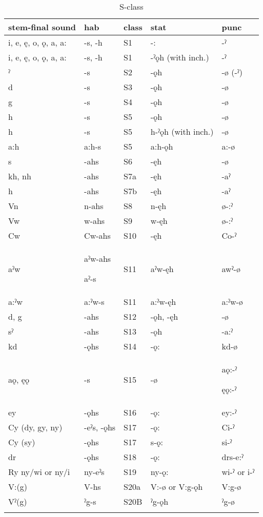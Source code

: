 \begin{table}
\caption{S-class}
\label{tab:1:Sclass}
\scriptsize{
\begin{tabularx}{\textwidth}{XXXXX}
\lsptoprule
stem-final sound & hab & class & stat & punc \\
\midrule
i, e, ę, o, ǫ, a, a: & {}-s, -h & S1 & {}-: & {}-ˀ\\
i, e, ę, o, ǫ, a, a: & {}-s, -h & S1 & {}-ˀǫh (with inch.) & {}-ˀ\\
{}ˀ & {}-s & S2 & {}-ǫh & {}-ø (-ˀ)\\
d & {}-s & S3 & {}-ǫh & {}-ø\\
g & {}-s & S4 & {}-ǫh & {}-ø\\
h & {}-s & S5 & {}-ǫh & {}-ø\\
h & {}-s & S5 & h{}-ˀǫh (with inch.) & {}-ø\\
a:h & a:h{}-s & S5 & a:h-ǫh & a:-ø\\
s & {}-ahs & S6 & {}-ęh & {}-ø\\
kh, nh & {}-ahs & S7a & {}-ęh & {}-aˀ\\
h & {}-ahs & S7b & {}-ęh & {}-aˀ\\
Vn & n-ahs & S8 & n-ęh & ø-:ˀ\\
Vw & w-ahs & S9 & w-ęh & ø-:ˀ\\
Cw & Cw-ahs & S10 & {}-ęh & Co-ˀ\\
aˀw & aˀw-ahs

aˀ-s & S11 & aˀw-ęh & awˀ-ø\\
a:ˀw & a:ˀw{}-s & S11 & a:ˀw-ęh & a:ˀw{}-ø\\
d, g & {}-ahs & S12 & {}-ǫh, -ęh & {}-ø\\
sˀ & {}-ahs & S13 & {}-ǫh & {}-a:ˀ\\
kd & {}-ǫhs & S14 & {}-ǫ: & kd-ø\\
aǫ, ęǫ & {}-s & S15 & {}-ø & aǫ:-ˀ

ęǫ:-ˀ\\
ey & {}-ǫhs & S16 & {}-ǫ: & ey:-ˀ\\
Cy (dy, gy, ny) & {}-eˀs, -ǫhs & S17 & {}-ǫ: & Ci-ˀ\\
Cy (sy) & {}-ǫhs & S17 & s-ǫ: & si-ˀ\\
dr & {}-ǫhs & S18 & {}-ǫ: & drs-e:ˀ\\
Ry ny/wi or ny/i & ny-eˀs & S19 & ny-ǫ: & wi-ˀ or i-ˀ\\
V:(g) & V-hs & S20a & V:-ø or V:g-ǫh & V:g-ø\\
Vˀ(g) & ˀg{}-s & S20B & ˀg{}-ǫh & ˀg-ø\\
\lspbottomrule
\end{tabularx}}
\end{table}

